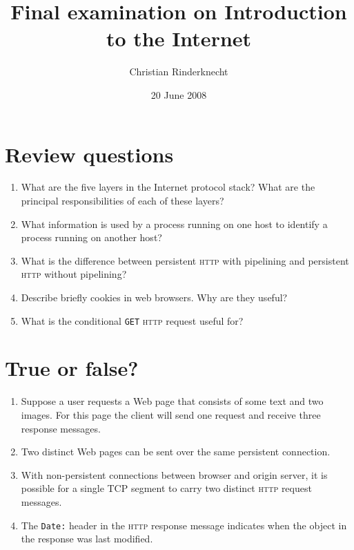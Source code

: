\documentclass[11pt,a4paper]{article}
\title{Final examination on Introduction to the Internet}
\author{Christian Rinderknecht}
\date{20 June 2008}
\begin{document}
\maketitle

\thispagestyle{empty}

\section{Review questions}

\begin{enumerate}

  \item What are the five layers in the Internet protocol stack? What
    are the principal responsibilities of each of these layers?

  \item What information is used by a process running on one host to
    identify a process running on another host?

  \item What is the difference between persistent \textsc{http}
    with pipelining and persistent \textsc{http} without pipelining?

  \item Describe briefly cookies in web browsers. Why are they useful?

  \item What is the conditional \texttt{GET} \textsc{http} request
    useful for?

\end{enumerate}

\section{True or false?}

  \begin{enumerate}

    \item Suppose a user requests a Web page that consists of some text
      and two images. For this page the client will send one request
      and receive three response messages.

    \item Two distinct Web pages can be sent over the same persistent
      connection.

    \item With non-persistent connections between browser and origin
      ser\-ver, it is possible for a single TCP segment to carry two
      distinct \textsc{http} request messages.

    \item The \verb+Date:+ header in the \textsc{http} response
      message indicates when the object in the response was last
      modified.

  \end{enumerate}
\end{document}
